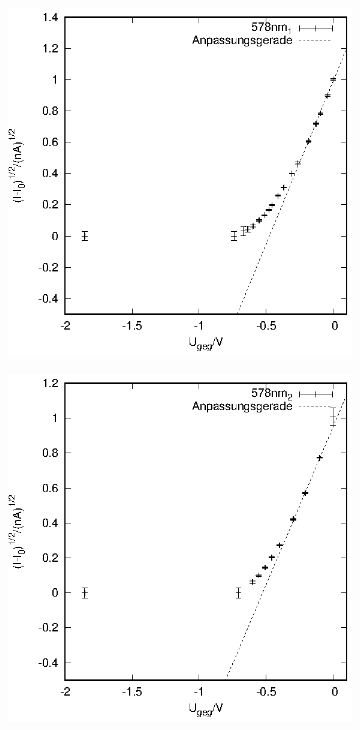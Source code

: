 \begin{figure}
\begin{subfigure}[h]{0.49\textwidth}
  \end{subfigure}
  \begin{subfigure}[h]{0.49\textwidth}
    \centering
    \includegraphics{data/Messung_photoeffekt/578nm_1.eps}
  \end{subfigure}
  \begin{subfigure}[h]{0.49\textwidth}
    \centering
    \includegraphics{data/Messung_photoeffekt/578nm_2.eps}
  \end{subfigure}
\end{figure}

